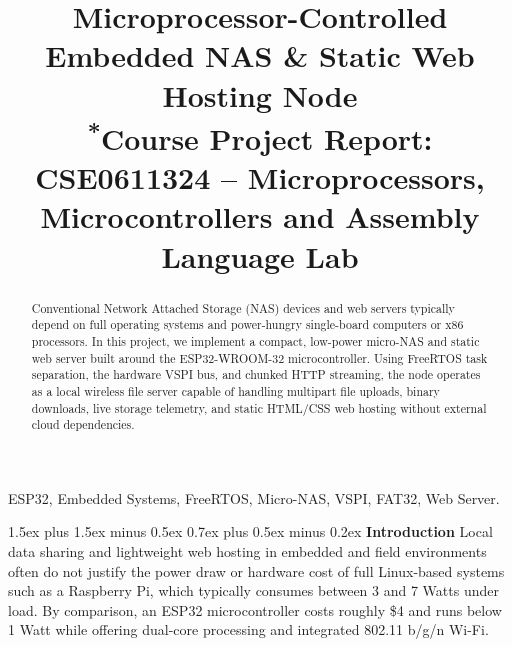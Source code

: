 \documentclass[conference]{IEEEtran}
\makeatletter
\renewcommand\section{\@startsection{section}{1}{\z@}%
  {1.5ex plus 1.5ex minus 0.5ex}%
  {0.7ex plus 0.5ex minus 0.2ex}%
  {\normalfont\normalsize\bfseries\centering}}
\makeatother
\begin{document}
\title{Microprocessor-Controlled Embedded NAS \& Static Web Hosting Node\\
{\footnotesize \textsuperscript{*}Course Project Report: CSE0611324 -- Microprocessors, Microcontrollers and Assembly Language Lab}}

\author{
\and
{}
\and
{}
}

\maketitle

\begin{abstract}
Conventional Network Attached Storage (NAS) devices and web servers typically depend on full operating systems and power-hungry single-board computers or x86 processors. In this project, we implement a compact, low-power micro-NAS and static web server built around the ESP32-WROOM-32 microcontroller. Using FreeRTOS task separation, the hardware VSPI bus, and chunked HTTP streaming, the node operates as a local wireless file server capable of handling multipart file uploads, binary downloads, live storage telemetry, and static HTML/CSS web hosting without external cloud dependencies.
\end{abstract}

\begin{IEEEkeywords}
ESP32, Embedded Systems, FreeRTOS, Micro-NAS, VSPI, FAT32, Web Server.
\end{IEEEkeywords}

\section{\textbf{Introduction}}
Local data sharing and lightweight web hosting in embedded and field environments often do not justify the power draw or hardware cost of full Linux-based systems such as a Raspberry Pi, which typically consumes between 3 and 7 Watts under load. By comparison, an ESP32 microcontroller costs roughly \$4 and runs below 1 Watt while offering dual-core processing and integrated 802.11 b/g/n Wi-Fi.
\end{document}

